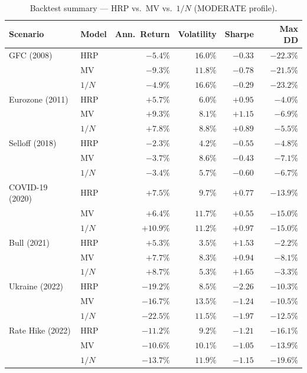 \documentclass[11pt, a4paper]{article}
\begin{document}
\begin{table}[H]
\centering\small
\caption{Backtest summary — HRP vs.\ MV vs.\ $1/N$ (MODERATE profile).}
\begin{tabular}{llrrrr}
\toprule
Scenario & Model & Ann.\ Return & Volatility & Sharpe & Max DD \\
\midrule
GFC (2008)       & HRP   & $-5.4\%$  & $16.0\%$ & $-0.33$ & $-22.3\%$ \\
                 & MV    & $-9.3\%$  & $11.8\%$ & $-0.78$ & $-21.5\%$ \\
                 & $1/N$ & $-4.9\%$  & $16.6\%$ & $-0.29$ & $-23.2\%$ \\
\midrule
Eurozone (2011)  & HRP   & $+5.7\%$  & $6.0\%$  & $+0.95$ & $-4.0\%$  \\
                 & MV    & $+9.3\%$  & $8.1\%$  & $+1.15$ & $-6.9\%$  \\
                 & $1/N$ & $+7.8\%$  & $8.8\%$  & $+0.89$ & $-5.5\%$  \\
\midrule
Selloff (2018)   & HRP   & $-2.3\%$  & $4.2\%$  & $-0.55$ & $-4.8\%$  \\
                 & MV    & $-3.7\%$  & $8.6\%$  & $-0.43$ & $-7.1\%$  \\
                 & $1/N$ & $-3.4\%$  & $5.7\%$  & $-0.60$ & $-6.7\%$  \\
\midrule
COVID-19 (2020)  & HRP   & $+7.5\%$  & $9.7\%$  & $+0.77$ & $-13.9\%$ \\
                 & MV    & $+6.4\%$  & $11.7\%$ & $+0.55$ & $-15.0\%$ \\
                 & $1/N$ & $+10.9\%$ & $11.2\%$ & $+0.97$ & $-15.0\%$ \\
\midrule
Bull (2021)      & HRP   & $+5.3\%$  & $3.5\%$  & $+1.53$ & $-2.2\%$  \\
                 & MV    & $+7.7\%$  & $8.3\%$  & $+0.94$ & $-8.1\%$  \\
                 & $1/N$ & $+8.7\%$  & $5.3\%$  & $+1.65$ & $-3.3\%$  \\
\midrule
Ukraine (2022)   & HRP   & $-19.2\%$ & $8.5\%$  & $-2.26$ & $-10.3\%$ \\
                 & MV    & $-16.7\%$ & $13.5\%$ & $-1.24$ & $-10.5\%$ \\
                 & $1/N$ & $-22.5\%$ & $11.5\%$ & $-1.97$ & $-12.5\%$ \\
\midrule
Rate Hike (2022) & HRP   & $-11.2\%$ & $9.2\%$  & $-1.21$ & $-16.1\%$ \\
                 & MV    & $-10.6\%$ & $10.1\%$ & $-1.05$ & $-13.9\%$ \\
                 & $1/N$ & $-13.7\%$ & $11.9\%$ & $-1.15$ & $-19.6\%$ \\
\bottomrule
\end{tabular}
\end{table}
\end{document}
